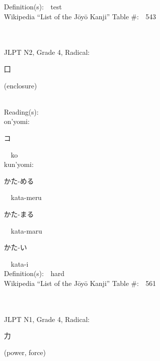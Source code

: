 \begin{multicols}{2}
Definition(s):\ \ test \\
Wikipedia ``List of the J\=oy\=o Kanji'' Table \#:\ \ 543 \\
\ \ \\
{\fontsize{34pt}{40pt}  }\ \ \\  %
{JLPT N2, Grade 4, Radical:\ \ {\begin{CJK}{UTF8}{min} 囗 \end{CJK}} (enclosure) } \\
Reading(s):\ \ \\
{\hspace*{1em}}on'yomi:\ \ \\
{\hspace*{2em}}{\begin{CJK}{UTF8}{min} コ \end{CJK}}\ \ ko\ \ \\
{\hspace*{1em}}kun'yomi:\ \ \\
{\hspace*{2em}}{\begin{CJK}{UTF8}{min} かた-める \end{CJK}}\ \ kata-meru\ \ \\
{\hspace*{2em}}{\begin{CJK}{UTF8}{min} かた-まる \end{CJK}}\ \ kata-maru\ \ \\
{\hspace*{2em}}{\begin{CJK}{UTF8}{min} かた-い \end{CJK}}\ \ kata-i\ \ \\
Definition(s):\ \ hard \\
Wikipedia ``List of the J\=oy\=o Kanji'' Table \#:\ \ 561 \\
\ \ \\
{\fontsize{34pt}{40pt}  }\ \ \\  %
{JLPT N1, Grade 4, Radical:\ \ {\begin{CJK}{UTF8}{min} 力 \end{CJK}} (power, force) } \\

\end{multicols}

